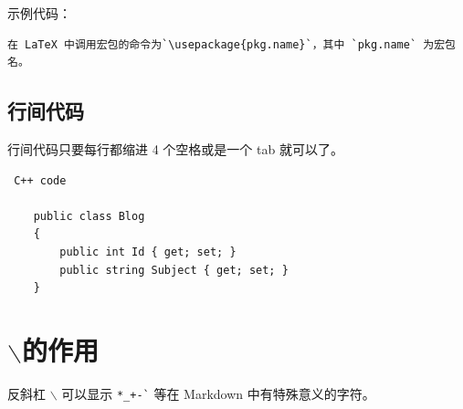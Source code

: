 示例代码：
\begin{verbatim}
在 LaTeX 中调用宏包的命令为`\usepackage{pkg.name}`，其中 `pkg.name` 为宏包名。
\end{verbatim}


\subsection{行间代码}
行间代码只要每行都缩进 4 个空格或是一个 tab 就可以了。
\begin{verbatim}
 C++ code

    public class Blog
    {
        public int Id { get; set; }
        public string Subject { get; set; }
    }
\end{verbatim}


\section{$\backslash$的作用}
反斜杠 $\backslash$  可以显示 \verb|*_+-`| 等在 Markdown 中有特殊意义的字符。


















